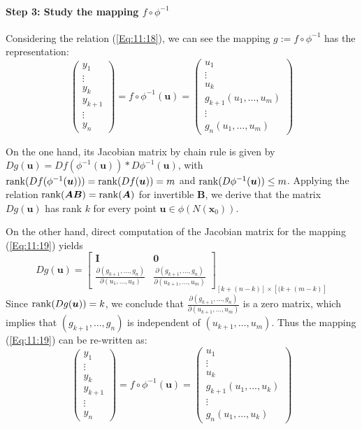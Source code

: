 \paragraph{Step 3: Study the mapping $f\circ\phi^{-1}$}
Considering the relation (\ref{Eq:11:18}), we can see the mapping $g:=f\circ\phi^{-1}$ has the representation:
\begin{equation}\label{Eq:11:19}
\begin{pmatrix}
y_1\\\vdots\\y_k\\y_{k+1}\\\vdots\\y_n
\end{pmatrix}=f\circ\phi^{-1}(\bm u)=\begin{pmatrix}
u_1\\\vdots\\u_k\\g_{k+1}(u_1,\dots,u_m)\\\vdots\\g_n(u_1,\dots,u_m)
\end{pmatrix}
\end{equation}

On the one hand, its Jacobian matrix by chain rule is given by $Dg(\bm u)=Df(\phi^{-1}(\bm u))* D\phi^{-1}(\bm u)$, with $\operatorname{rank}(Df(\phi^{-1}(\bm u)))=\operatorname{rank}(Df(\bm u))=m$ and $\operatorname{rank}(D\phi^{-1}(\bm u))\le m$. Applying the relation $\operatorname{rank}(\bm{AB})=\operatorname{rank}(\bm A)$ for invertible $\bm B$, we derive that the matrix $Dg(\bm u)$ has rank $k$ for every point $\bm u\in\phi(N(\bm x_0))$.

On the other hand, direct computation of the Jacobian matrix for the mapping (\ref{Eq:11:19}) yields
\[
Dg(\bm u)=\begin{bmatrix}
\bm I&\bm0\\
\frac{\partial(g_{k+1},\dots,g_n)}{\partial(u_1,\dots,u_k)}
&
\frac{\partial(g_{k+1},\dots,g_n)}{\partial(u_{k+1},\dots,u_m)}
\end{bmatrix}_{[k+(n-k)]\times[(k+(m-k)]}
\]
Since $\operatorname{rank}(Dg(\bm u))=k$, we conclude that $\frac{\partial(g_{k+1},\dots,g_n)}{\partial(u_{k+1},\dots,u_m)}$ is a zero matrix, which implies that $(g_{k+1},\dots,g_n)$ is independent of $(u_{k+1},\dots,u_m)$. Thus the mapping (\ref{Eq:11:19}) can be re-written as:
\begin{equation}\label{Eq:11:20}
\begin{pmatrix}
y_1\\\vdots\\y_k\\y_{k+1}\\\vdots\\y_n
\end{pmatrix}=f\circ\phi^{-1}(\bm u)=\begin{pmatrix}
u_1\\\vdots\\u_k\\g_{k+1}(u_1,\dots,u_k)\\\vdots\\g_n(u_1,\dots,u_k)
\end{pmatrix}
\end{equation}

